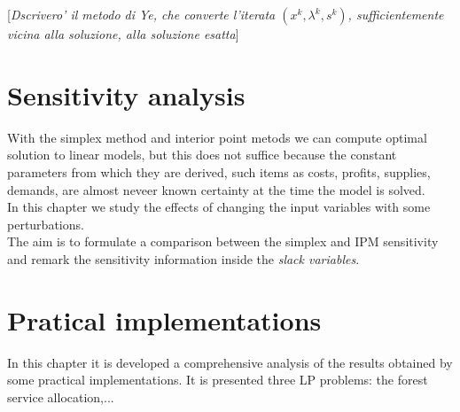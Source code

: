 \documentclass[a4paper,10 pt,titlepage,twoside]{book}
\theoremstyle{plain}
\theoremstyle{definition}
\theoremstyle{remark}
\begin{document}
[\textit{Dscrivero' il metodo di Ye, che converte l'iterata $(x^{k}, \lambda^{k},s^{k})$, sufficientemente vicina alla soluzione, alla soluzione esatta}]
\chapter{Sensitivity analysis}
With the simplex method and interior point metods we can compute optimal solution to linear models, but this does not suffice because the constant parameters from which they are derived, such items as costs, profits, supplies, demands, are almost neveer known certainty at the time the model is solved.\\
In this chapter we study the effects of changing the input variables with some perturbations.\\ The aim is to formulate a comparison between the simplex and IPM sensitivity and remark the sensitivity information inside the \textit{slack variables}.
\chapter{Pratical implementations}
In this chapter it is developed a comprehensive analysis of the results obtained by some practical implementations. It is presented three LP problems: the forest service allocation,...\\
\end{document}
